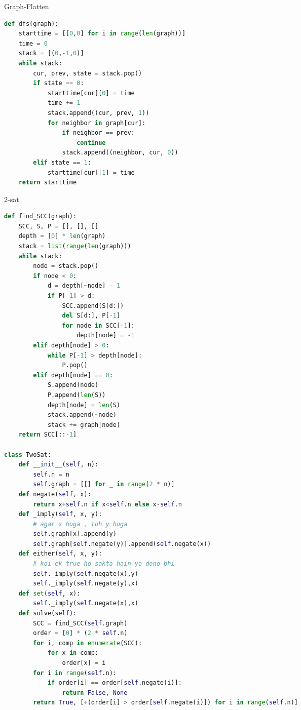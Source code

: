 \documentclass[10pt,landscape, a4paper]{article}
\begin{document}
\begin{multicols*}{3}
Graph-Flatten
\begin{lstlisting}[language=Python]
def dfs(graph):
    starttime = [[0,0] for i in range(len(graph))]
    time = 0
    stack = [(0,-1,0)]
    while stack:
        cur, prev, state = stack.pop()
        if state == 0:
            starttime[cur][0] = time
            time += 1
            stack.append((cur, prev, 1))
            for neighbor in graph[cur]:
                if neighbor == prev:
                    continue
                stack.append((neighbor, cur, 0))
        elif state == 1:
            starttime[cur][1] = time
    return starttime
\end{lstlisting}

2-sat
\begin{lstlisting}[language=Python]
def find_SCC(graph):
    SCC, S, P = [], [], []
    depth = [0] * len(graph)
    stack = list(range(len(graph)))
    while stack:
        node = stack.pop()
        if node < 0:
            d = depth[~node] - 1
            if P[-1] > d:
                SCC.append(S[d:])
                del S[d:], P[-1]
                for node in SCC[-1]:
                    depth[node] = -1
        elif depth[node] > 0:
            while P[-1] > depth[node]:
                P.pop()
        elif depth[node] == 0:
            S.append(node)
            P.append(len(S))
            depth[node] = len(S)
            stack.append(~node)
            stack += graph[node]
    return SCC[::-1]

class TwoSat:
    def __init__(self, n):
        self.n = n
        self.graph = [[] for _ in range(2 * n)]
    def negate(self, x):
        return x+self.n if x<self.n else x-self.n
    def _imply(self, x, y):
        # agar x hoga , toh y hoga
        self.graph[x].append(y)
        self.graph[self.negate(y)].append(self.negate(x))
    def either(self, x, y):
        # koi ek true ho sakta hain ya dono bhi
        self._imply(self.negate(x),y)
        self._imply(self.negate(y),x)
    def set(self, x):
        self._imply(self.negate(x),x)
    def solve(self):
        SCC = find_SCC(self.graph)
        order = [0] * (2 * self.n)
        for i, comp in enumerate(SCC):
            for x in comp:
                order[x] = i
        for i in range(self.n):
            if order[i] == order[self.negate(i)]:
                return False, None
        return True, [+(order[i] > order[self.negate(i)]) for i in range(self.n)]
\end{lstlisting}


\end{multicols*}
\end{document}
